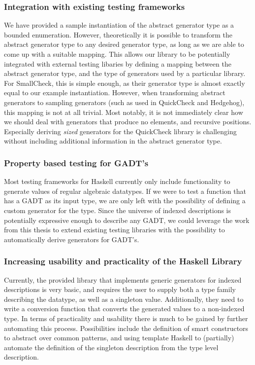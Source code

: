 \documentclass[a4paper,msc,twosized=semi]{uustthesis}
\begin{document}
\subsubsection{Integration with existing testing frameworks}

  We have provided a sample instantiation of the abstract generator type as a bounded 
  enumeration. However, theoretically it is possible to transform the abstract 
  generator type to any desired generator type, as long as we are able to come up with 
  a suitable mapping. This allows our library to be potentially integrated with 
  external testing libaries by defining a mapping between the abstract generator type, 
  and the type of generators used by a particular library. For SmallCheck, this is 
  simple enough, as their generator type is almost exactly equal to our example 
  instantiation. However, when transforming abstract generators to sampling generators 
  (such as used in QuickCheck and Hedgehog), this mapping is not at all trivial. Most 
  notably, it is not immediately clear how we should deal with generators that produce 
  no elements, and recursive positions. Especially deriving \emph{sized} generators 
  for the QuickCheck library is challenging without including additional information 
  in the abstract generator type. 

\subsubsection{Property based testing for GADT's}

  Most testing frameworks for Haskell currently only include functionality to generate 
  values of regular algebraic datatypes. If we were to test a function that has a GADT 
  as its input type, we are only left with the possibility of defining a custom 
  generator for the type. Since the universe of indexed descriptions is potentially 
  expressive enough to describe any GADT, we could leverage the work from this thesis 
  to extend existing testing libraries with the possibility to automatically derive 
  generators for GADT's. 

\subsubsection{Increasing usability and practicality of the Haskell Library}

  Currently, the provided library that implements generic generators for indexed 
  descriptions is very basic, and requires the user to supply both a type family 
  describing the datatype, as well as a singleton value. Additionally, they need to 
  write a conversion function that converts the generated values to a non-indexed 
  type. In terms of practicality and usability there is much to be gained by further 
  automating this process. Possibilities include the definition of smart constructors 
  to abstract over common patterns, and using template Haskell \cite
  {sheard2002template} to (partially) automate the definition of the singleton 
  description from the type level description. 
\end{document}
